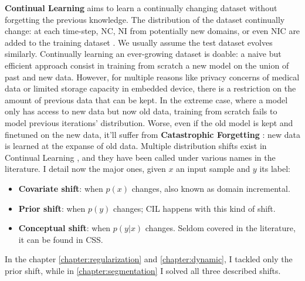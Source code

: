 \textbf{Continual Learning} aims to learn a continually changing dataset without forgetting the
previous knowledge. The distribution of the dataset continually change: at each time-step, \ac{NC},
\ac{NI} from potentially new domains, or even \ac{NIC} are added to the training dataset
\cite{lomonaco2017core50}. We usually assume the test dataset evolves similarly. Continually
learning an ever-growing dataset is doable: a naive but efficient approach consist in training from
scratch a new model on the union of past and new data. However, for multiple reasons like privacy
concerns of medical data or limited storage capacity in embedded device, there is a restriction on
the amount of previous data that can be kept. In the extreme case, where a model only has access to
new data but now old data, training from scratch fails to model previous iterations' distribution.
Worse, even if the old model is kept and finetuned on the new data, it'll suffer from
\textbf{Catastrophic Forgetting} \citep{robins1995catastrophicforgetting}: new data is learned at
the expanse of old data. Multiple distribution shifts exist in Continual Learning
\citep{morenotorresa2012datasetshift,lesort2021driftanalysis}, and they have been called under various names in the
literature. I detail now the major ones, given $x$ an input sample and $y$ its label:

\begin{itemize}
      \item \textbf{Covariate shift}: when $p(x)$ changes, also known as domain incremental.
      \item \textbf{Prior shift}: when $p(y)$ changes; \ac{CIL} happens with this kind of shift.
      \item \textbf{Conceptual shift}: when $p(y | x)$ changes. Seldom covered in the literature, it
            can be found in \acf{CSS}.
\end{itemize}

In the chapter \autoref{chapter:regularization} and \autoref{chapter:dynamic}, I tackled only the
prior shift, while in \autoref{chapter:segmentation} I solved all three described shifts.


